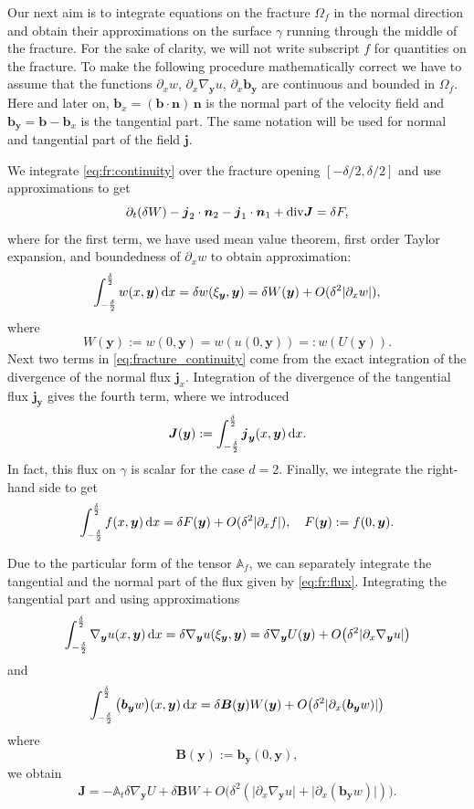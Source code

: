 \documentclass[a4paper]{article}
\def\prtl{\partial}
\def\vc#1{\mathbf{\boldsymbol{#1}}}     %
\def\tn#1{{\mathbb{#1}}}    %
\def\abs#1{\lvert#1\rvert}
\def\div{{\rm div}}
\def\grad{\nabla}
\def\d {\,{\rm d}}
\begin{document}
Our next aim is to integrate equations on the fracture $\Omega_f$ in the normal direction 
and obtain their approximations on the surface $\gamma$ running through the middle of the fracture. 
For the sake of clarity, we will not write subscript $f$ for quantities on the fracture. 
To make the following procedure mathematically correct we have to assume that the functions
$\prtl_x w$, $\prtl_x \grad_{\vc y} u$, $\prtl_x \vc b_{\vc y}$ are continuous and bounded in $\Omega_f$. Here and later on, 
$\vc b_x=(\vc b \cdot \vc n)\, \vc n$ is the normal part of the velocity field and $\vc b_{\vc y} = \vc b - \vc b_x$ is the tangential part.
The same notation will be used for normal and tangential part of the field $\vc j$.

We integrate \eqref{eq:fr:continuity} over the fracture opening $[-\delta/2,\delta/2]$ and use approximations to get
\begin{equation}
    \label{eq:fracture_continuity}
   \prtl_t (\delta W) - \vc j_2 \cdot \vc n_2 - \vc j_1 \cdot \vc n_1 + \div \vc J = \delta F,
\end{equation}
where for the first term, we have used mean value theorem, first order Taylor expansion, 
and boundedness of $\prtl_x w$ to obtain approximation:
\[
    \int_{-\frac\delta2}^{\frac\delta2} w(x,\vc y) \d x=\delta w(\xi_{\vc y}, \vc y) = \delta W(\vc y) + O(\delta^2\abs{\prtl_x w}),
\]
where
\[
    W(\vc y):=w(0,\vc y)=w(u(0,\vc y))=:w(U(\vc y)).
\]
Next two terms in \eqref{eq:fracture_continuity} come from the exact integration 
of the divergence of the normal flux $\vc j_x$.
Integration of the divergence of the tangential flux $\vc j_{\vc y}$ gives the fourth term, where we introduced
\[
\vc J(\vc y) := \int_{-\frac\delta2}^{\frac\delta2} \vc j_{\vc y}(x, \vc y) \d x.
\]
In fact, this flux on $\gamma$ is scalar for the case $d=2$. Finally, we integrate the right-hand side to get 
\[
    \int_{-\frac\delta2}^{\frac\delta2} f(x,\vc y) \d x = \delta F(\vc y) + O(\delta^2\abs{\prtl_x f}),\quad F(\vc y):=f(0,\vc y). 
\]


Due to the particular form of the tensor $\tn A_f$, we can separately integrate the tangential and the normal
part of the flux given by \eqref{eq:fr:flux}. Integrating the tangential part and using approximations
\[
    \int_{-\frac\delta2}^{\frac\delta2}  \grad_{\vc y} u(x, \vc y) \d x = \delta \grad_{\vc y} u (\xi_{\vc y}, \vc y) 
    = \delta \grad_{\vc y} U( \vc y) + O\big( \delta^2 \abs{\prtl_x\grad_{\vc y} u} \big) 
\]
and
\[
 \int_{-\frac\delta2}^{\frac\delta2} \big(\vc b_{\vc y} w\big)(x, \vc y) \d x 
  = \delta \vc B(\vc y) W(\vc y) + O\big(\delta^2 \abs{\prtl_x(\vc b_{\vc y} w)} \big)
\]
where
\[
  \vc B(\vc y) := \vc b_{\vc y}(0, \vc y),
\]
we obtain
\begin{equation}
    \label{eq:fracture_darcy}
   \vc J = -\tn A_t \delta \grad_{\vc y} U + \delta \vc B W + O\big(\delta^2(\abs{\prtl_x\grad_{\vc y} u}+\abs{\prtl_x(\vc b_{\vc y} w)})\big).
\end{equation}
\end{document}
